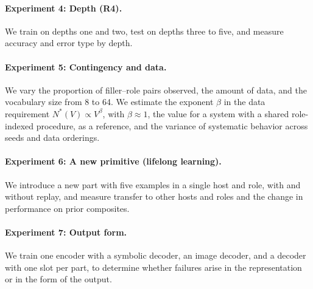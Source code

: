 \documentclass{article}
\theoremstyle{definition}
\theoremstyle{plain}
\theoremstyle{remark}
\begin{document}
\paragraph{Experiment 4: Depth (R4).} We train on depths one and two,
test on depths three to five, and measure accuracy and error type by
depth.

\paragraph{Experiment 5: Contingency and data.} We vary the proportion
of filler--role pairs observed, the amount of data, and the vocabulary
size from 8 to 64. We estimate the exponent $\beta$ in the data
requirement $N^{*}(V) \propto V^{\beta}$, with $\beta \approx 1$, the value for a system with a shared
role-indexed procedure, as a reference, and the variance of systematic
behavior across seeds and data orderings.

\paragraph{Experiment 6: A new primitive (lifelong learning).} We
introduce a new part with five examples in a single host and role,
with and without replay, and measure transfer to other hosts and roles
and the change in performance on prior composites.

\paragraph{Experiment 7: Output form.} We train one encoder with a
symbolic decoder, an image decoder, and a decoder with one slot per
part, to determine whether failures arise in the representation or in
the form of the output.
\end{document}

